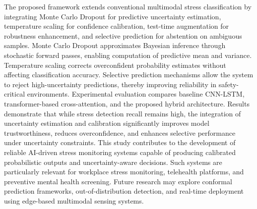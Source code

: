 \documentclass[conference]{IEEEtran}
\begin{document}
The proposed framework extends conventional multimodal stress classification by integrating Monte Carlo Dropout for predictive uncertainty estimation, temperature scaling for confidence calibration, test-time augmentation for robustness enhancement, and selective prediction for abstention on ambiguous samples. Monte Carlo Dropout approximates Bayesian inference through stochastic forward passes, enabling computation of predictive mean and variance. Temperature scaling corrects overconfident probability estimates without affecting classification accuracy. Selective prediction mechanisms allow the system to reject high-uncertainty predictions, thereby improving reliability in safety-critical environments.
Experimental evaluation compares baseline CNN-LSTM, transformer-based cross-attention, and the proposed hybrid architecture. Results demonstrate that while stress detection recall remains high, the integration of uncertainty estimation and calibration significantly improves model trustworthiness, reduces overconfidence, and enhances selective performance under uncertainty constraints.
This study contributes to the development of reliable AI-driven stress monitoring systems capable of producing calibrated probabilistic outputs and uncertainty-aware decisions. Such systems are particularly relevant for workplace stress monitoring, telehealth platforms, and preventive mental health screening. Future research may explore conformal prediction frameworks, out-of-distribution detection, and real-time deployment using edge-based multimodal sensing systems.
\end{document}

